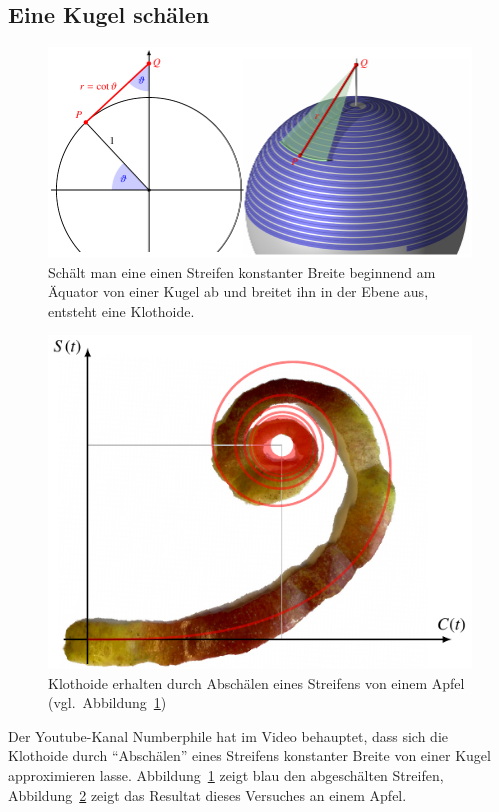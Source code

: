\subsection{Eine Kugel schälen}
\begin{figure}
\centering
\includegraphics[width=\textwidth]{papers/fresnel/images/schale.pdf}
\caption{Schält man eine einen Streifen konstanter Breite beginnend am
Äquator von einer Kugel ab und breitet ihn in der Ebene aus, entsteht
eine Klothoide.
\label{fresnel:figure:schale}}
\end{figure}
\begin{figure}
\centering
\includegraphics{papers/fresnel/images/apfel.pdf}
\caption{Klothoide erhalten durch Abschälen eines Streifens von einem
Apfel (vgl.~Abbildung~\ref{fresnel:figure:schale})
\label{fresnel:figure:apfel}}
\end{figure}
Der Youtube-Kanal Numberphile hat im Video \cite{fresnel:schale} behauptet,
dass sich die Klothoide durch ``Abschälen'' eines Streifens konstanter
Breite von einer Kugel approximieren lasse.
Abbildung~\ref{fresnel:figure:schale} zeigt blau den abgeschälten Streifen,
Abbildung~\ref{fresnel:figure:apfel} zeigt das Resultat dieses Versuches
an einem Apfel.

